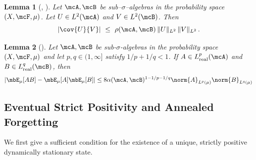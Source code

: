 \documentclass[a4paper]{article}
\numberwithin{equation}{section}   %
\theoremstyle{plain}   %
\theoremstyle{plain}   %
\newtheorem{lemma}{Lemma}[section]   %
\theoremstyle{examplestyle}
\begin{document}
    \begin{lemma}[{\cite[\S1.2 Thm.~3]{doukhan2012mixing}}, {\cite[Thm.~3.8]{bradley2007introduction}}]
    \label{lemma:covariance_bounds}
        Let $\mcA,\mcB$ be sub–$\sigma$–algebras in the probability space  $(X, \mcF, \mu)$. 
        Let $U\in L^2(\mcA)$ and $V\in L^2(\mcB)$. Then
        \[
            |\cov{U}{V}|\ \le\ \rho(\mcA,\mcB)\,\|U\|_{L^2}\,\|V\|_{L^2}\,.
        \]
    \end{lemma}
    
    \begin{lemma}[{\cite[Theorem~3.7]{bradley2007introduction}}]
    \label{lemma:correlation_bounds}
        Let $\mcA, \mcB$ be sub-$\sigma$-algebras in the probability space $(X, \mcF, \mu)$ and let $p,q\in (1,\infty]$ satisfy $1/p+1/q <1$. If $A\in L^p_{\mathrm{real}}(\mcA)$ and $B\in L^q_{\mathrm{real}}(\mcB)$, then 
        \begin{equation}
            \left|\mbE_{\mu}[AB] - \mbE_{\mu}[A]\mbE_{\mu}[B]\right|
            \le
            8 \alpha(\mcA,\mcB)^{1-1/p-1/q}\norm{A}_{L^p(\mu)}\norm{B}_{L^q(\mu)}
        \end{equation}
    \end{lemma}
    

\subsection{Eventual Strict Positivity and Annealed Forgetting}
\label{subsec:esp_forgetting}


    We first give a sufficient condition for the existence of a unique, strictly positive dynamically stationary state. 
\end{document}
